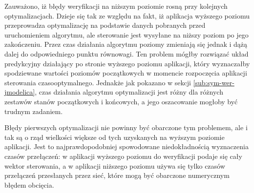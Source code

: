 Zauważono, iż błędy weryfikacji na niższym poziomie rosną przy kolejnych optymalizacjach. Dzieje się tak ze względu na fakt, iż aplikacja wyższego poziomu przeprowadza optymalizację na podstawie danych pobranych przed uruchomieniem algorytmu, ale sterowanie jest wysyłane na niższy poziom po jego zakończeniu. Przez czas działania algorytmu poziomy zmieniają się jednak i dążą dalej do odpowiedniego punktu równowagi. Ten problem mógłby rozwiązać układ predykcyjny działający po stronie wyższego poziomu aplikacji, który wyznaczałby spodziewane wartości poziomów początkowych w momencie rozpoczęcia aplikacji sterowania czasooptymalnego. Jednakże jak pokazano w sekcji \ref{sub:sym-wer-jmodelica}, czas działania algorytmu optymalizacji jest różny dla różnych zestawów stanów początkowych i końcowych, a jego oszacowanie mogłoby być trudnym zadaniem.

Błędy pierwszych optymalizacji nie powinny być obarczone tym problemem, ale i tak są o rząd wielkości większe od tych uzyskanych na wyższym poziomie aplikacji. Jest to najprawdopodobniej spowodowane niedokładnością wyznaczenia czasów przełączeń: w aplikacji wyższego poziomu do weryfikacji podaje się cały wektor sterowania, a w aplikacji niższego poziomu używa się tylko czasów przełączeń przesłanych przez sieć, które mogą być obarczone numerycznym błędem obcięcia.
